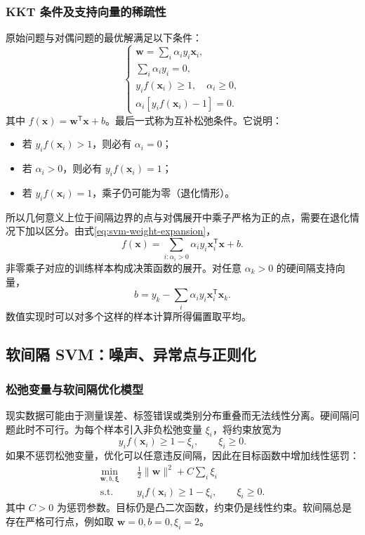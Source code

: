 \subsubsection{KKT 条件及支持向量的稀疏性}

原始问题与对偶问题的最优解满足以下条件：
\begin{equation}\label{eq:svm-hard-kkt}
\begin{cases}
\boldsymbol w=\sum_i\alpha_i y_i\boldsymbol x_i,\\
\sum_i\alpha_i y_i=0,\\
y_i f(\boldsymbol x_i)\geq1,\quad \alpha_i\geq0,\\
\alpha_i[y_i f(\boldsymbol x_i)-1]=0.
\end{cases}
\end{equation}
其中 $f(\boldsymbol x)=\boldsymbol w^{\mathsf T}\boldsymbol x+b$。最后一式称为互补松弛条件。它说明：
\begin{itemize}
\item 若 $y_i f(\boldsymbol x_i)>1$，则必有 $\alpha_i=0$；
\item 若 $\alpha_i>0$，则必有 $y_i f(\boldsymbol x_i)=1$；
\item 若 $y_i f(\boldsymbol x_i)=1$，乘子仍可能为零（退化情形）。
\end{itemize}
所以几何意义上位于间隔边界的点与对偶展开中乘子严格为正的点，需要在退化情况下加以区分。由式\eqref{eq:svm-weight-expansion}，
\[
f(\boldsymbol x)=\sum_{i:\alpha_i>0}\alpha_i y_i
\boldsymbol x_i^{\mathsf T}\boldsymbol x+b.
\]
非零乘子对应的训练样本构成决策函数的展开。对任意 $\alpha_k>0$ 的硬间隔支持向量，
\begin{equation}\label{eq:svm-b-recover}
b=y_k-\sum_i\alpha_i y_i\boldsymbol x_i^{\mathsf T}\boldsymbol x_k.
\end{equation}
数值实现时可以对多个这样的样本计算所得偏置取平均。

\subsection{软间隔 SVM：噪声、异常点与正则化}

\subsubsection{松弛变量与软间隔优化模型}

现实数据可能由于测量误差、标签错误或类别分布重叠而无法线性分离。硬间隔问题此时不可行。为每个样本引入非负松弛变量 $\xi_i$，将约束放宽为
\[
y_i f(\boldsymbol x_i)\geq1-\xi_i,\qquad \xi_i\geq0.
\]
如果不惩罚松弛变量，优化可以任意违反间隔，因此在目标函数中增加线性惩罚：
\begin{equation}\label{eq:svm-soft-primal}
\begin{aligned}
\min_{\boldsymbol w,b,\boldsymbol\xi}\quad&
\frac12\|\boldsymbol w\|^2+C\sum_i\xi_i\\
\text{s.t.}\quad&y_i f(\boldsymbol x_i)\geq1-\xi_i,\qquad \xi_i\geq0.
\end{aligned}
\end{equation}
其中 $C>0$ 为惩罚参数。目标仍是凸二次函数，约束仍是线性约束。软间隔总是存在严格可行点，例如取 $\boldsymbol w=0,b=0,\xi_i=2$。

